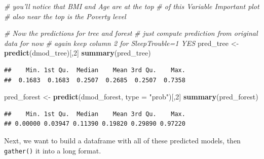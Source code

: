 \documentclass[]{article}
\newenvironment{Shaded}{\begin{snugshade}}{\end{snugshade}}
\newcommand{\KeywordTok}[1]{\textcolor[rgb]{0.13,0.29,0.53}{\textbf{{#1}}}}
\newcommand{\DataTypeTok}[1]{\textcolor[rgb]{0.13,0.29,0.53}{{#1}}}
\newcommand{\DecValTok}[1]{\textcolor[rgb]{0.00,0.00,0.81}{{#1}}}
\newcommand{\StringTok}[1]{\textcolor[rgb]{0.31,0.60,0.02}{{#1}}}
\newcommand{\CommentTok}[1]{\textcolor[rgb]{0.56,0.35,0.01}{\textit{{#1}}}}
\newcommand{\NormalTok}[1]{{#1}}
\begin{document}
\begin{Shaded}
\begin{Highlighting}[]
\CommentTok{# you'll notice that BMI and Age are at the top}
\CommentTok{# of this Variable Important plot}
\CommentTok{# also near the top is the Poverty level}

\CommentTok{# Now the predictions for tree and forest}
\CommentTok{# just compute prediction from original data for now}
\CommentTok{# again keep column 2 for SleepTrouble=1 YES}
\NormalTok{pred_tree <-}\StringTok{ }\KeywordTok{predict}\NormalTok{(dmod_tree)[,}\DecValTok{2}\NormalTok{]}
\KeywordTok{summary}\NormalTok{(pred_tree)}
\end{Highlighting}
\end{Shaded}

\begin{verbatim}
##    Min. 1st Qu.  Median    Mean 3rd Qu.    Max. 
##  0.1683  0.1683  0.2507  0.2685  0.2507  0.7358
\end{verbatim}

\begin{Shaded}
\begin{Highlighting}[]
\NormalTok{pred_forest <-}\StringTok{ }\KeywordTok{predict}\NormalTok{(dmod_forest, }\DataTypeTok{type =} \StringTok{"prob"}\NormalTok{)[,}\DecValTok{2}\NormalTok{]}
\KeywordTok{summary}\NormalTok{(pred_forest)}
\end{Highlighting}
\end{Shaded}

\begin{verbatim}
##    Min. 1st Qu.  Median    Mean 3rd Qu.    Max. 
## 0.00000 0.03947 0.11390 0.19820 0.29890 0.97220
\end{verbatim}

\begin{Shaded}
\end{Shaded}

Next, we want to build a dataframe with all of these predicted models,
then \texttt{gather()} it into a long format.
\end{document}
